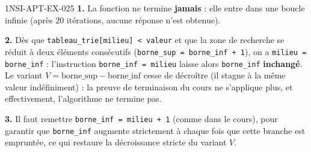 
\begin{corrige}{1NSI-APT-EX-025}
\textbf{1.} La fonction ne termine \textbf{jamais} : elle entre dans une boucle infinie
(après $20$ itérations, aucune réponse n'est obtenue).

\textbf{2.} Dès que \lstinline{tableau_trie[milieu] < valeur} et que la zone de recherche
se réduit à deux éléments consécutifs (\lstinline{borne_sup = borne_inf + 1}), on a
\lstinline{milieu = borne_inf} : l'instruction \lstinline{borne_inf = milieu} laisse alors
\lstinline{borne_inf} \textbf{inchangé}. Le variant $V=\text{borne\_sup}-\text{borne\_inf}$
cesse de décroître (il stagne à la même valeur indéfiniment) : la preuve de terminaison du
cours ne s'applique plus, et effectivement, l'algorithme ne termine pas.

\textbf{3.} Il faut remettre \lstinline{borne_inf = milieu + 1} (comme dans le cours), pour
garantir que \lstinline{borne_inf} augmente strictement à chaque fois que cette branche est
empruntée, ce qui restaure la décroissance stricte du variant $V$.
\end{corrige}
